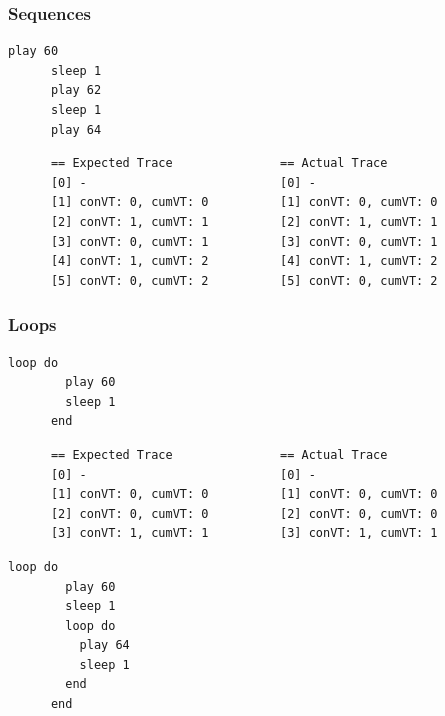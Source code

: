 \documentclass[11pt, abstracton, twoside]{scrartcl}
\begin{document}
\subsubsection{Sequences}
\begin{minipage}{\textwidth}
	\begin{lstlisting}[style = sonicpi]
      play 60
      sleep 1
      play 62
      sleep 1
      play 64
	\end{lstlisting}
\end{minipage}

\begin{lstlisting}
      == Expected Trace               == Actual Trace
      [0] -                           [0] -
      [1] conVT: 0, cumVT: 0          [1] conVT: 0, cumVT: 0
      [2] conVT: 1, cumVT: 1          [2] conVT: 1, cumVT: 1
      [3] conVT: 0, cumVT: 1          [3] conVT: 0, cumVT: 1
      [4] conVT: 1, cumVT: 2          [4] conVT: 1, cumVT: 2
      [5] conVT: 0, cumVT: 2          [5] conVT: 0, cumVT: 2
\end{lstlisting}

\subsubsection{Loops}
\begin{minipage}{\textwidth}
	\begin{lstlisting}[style = sonicpi]
      loop do
        play 60
        sleep 1
      end
	\end{lstlisting}
\end{minipage}

\begin{lstlisting}
      == Expected Trace               == Actual Trace
      [0] -                           [0] -
      [1] conVT: 0, cumVT: 0          [1] conVT: 0, cumVT: 0
      [2] conVT: 0, cumVT: 0          [2] conVT: 0, cumVT: 0
      [3] conVT: 1, cumVT: 1          [3] conVT: 1, cumVT: 1
\end{lstlisting}

\begin{minipage}{\textwidth}
	\begin{lstlisting}[style = sonicpi]
      loop do
        play 60
        sleep 1
        loop do
          play 64
          sleep 1
        end
      end
	\end{lstlisting}
\end{minipage}
\end{document}
